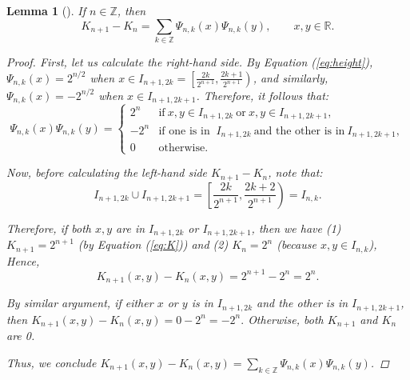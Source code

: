 \documentclass[11pt]{amsart}
\theoremstyle{theorem} %
\newtheorem{lem}[thm]{Lemma} %
\theoremstyle{definition}
\theoremstyle{example}
\theoremstyle{remark}
\numberwithin{equation}{section}
\newcommand{\R}{\mathbb{R}}
\newcommand{\Z}{\mathbb{Z}}
\begin{document}
\begin{lem}[{\cite[293]{pinsky}}] \label{lem:expansion}
	If $ n \in \Z $, then
	\[ K_{n+1} - K_n = \sum_{k \in \Z} \varPsi_{n,k}(x) \varPsi_{n,k}(y),\qquad x,y \in \R. \]
	
	\begin{proof}
		First, let us calculate the right-hand side.
		By Equation (\ref{eq:height}), $ \varPsi_{n,k}(x) = 2^{n/2} $ when $ x \in I_{n+1,2k} = \left[\frac{2k}{2^{n+1}}, \frac{2k+1}{2^{n+1}}\right) $, and similarly, $\varPsi_{n,k}(x)= -2^{n/2} $ when $ x \in I_{n+1,2k+1}$. Therefore, it follows that:
		\[
		\varPsi_{n,k}(x) \varPsi_{n,k} (y) =
		\begin{cases}
		2^n &\text{if}\ x,y \in I_{n+1,2k}\ \text{or}\ x,y \in I_{n+1,2k+1}, \\
		-2^n &\text{if one is in }\ I_{n+1,2k}\ \text{and the other is in}\ I_{n+1,2k+1}, \\
		0 &\text{otherwise}.
		\end{cases}
		\]
		
		Now, before calculating the left-hand side $ K_{n+1} - K_n $, note that:
		\[
		I_{n+1,2k} \cup I_{n+1,2k+1} = \left[ \frac{2k}{2^{n+1}}, \frac{2k+2}{2^{n+1}} \right) = I_{n,k}. 
		\]
		
		Therefore, if both $ x,y $ are in $ I_{n+1,2k} $ or $ I_{n+1,2k+1} $, then we have (1) $ K_{n+1} = 2^{n+1} $ (by Equation (\ref{eq:K})) and (2) $ K_n = 2^n $ (because $ x,y \in I_{n,k} $), Hence,
		\[ K_{n+1}(x,y) - K_n(x,y) = 2^{n+1} - 2^n = 2^n. \]

		By similar argument, if either $ x $ or $ y $ is in $  I_{n+1,2k} $ and the other is in $ I_{n+1,2k+1} $, then
		$ K_{n+1}(x,y) - K_n(x,y) = 0 - 2^n = -2^n. $ Otherwise, both $ K_{n+1} $ and $ K_n $ are 0.
		
		Thus, we conclude $ K_{n+1}(x,y) - K_n(x,y) = \sum_{k \in \Z} \varPsi_{n,k}(x) \varPsi_{n,k}(y) $.
	\end{proof}
\end{lem}
\end{document}

